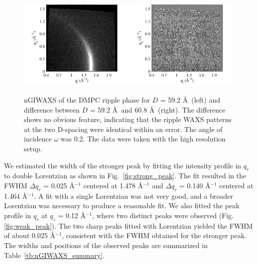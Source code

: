 \begin{figure}[htbp]
  \centering
  \includegraphics[width=0.49\textwidth]{figures/ripple/nGIWAXS/dmpc1_046}
  \includegraphics[width=0.49\textwidth]{figures/ripple/nGIWAXS/046_vs_052}
  \caption{nGIWAXS of the DMPC ripple phase for $D$ = 59.2 \AA\ (left)
  and difference between $D$ = 59.2 \AA\ and 60.8 \AA\ (right). 
  The difference shows no obvious feature, indicating that the ripple WAXS
  patterns at the two D-spacing were identical within an error.
  The angle of incidence $\omega$ was 0.2\textdegree. The data were taken
  with the high resolution setup.}
  \label{fig:nGIWAXS}
\end{figure}

We estimated the width of the stronger peak by fitting 
the intensity profile in $q_r$ to double Lorentzian as shown in 
Fig.~\ref{fig:strong_peak}. The fit resulted in the FWHM $\Delta q_r$
= 0.025 \AA$^{-1}$ centered at 1.478 \AA$^{-1}$ and 
$\Delta q_r$ = 0.140 \AA$^{-1}$ centered at 1.464 \AA$^{-1}$.
A fit with a single Lorentzian was not very good, and 
a broader Lorentzian was necessary to produce a reasonable fit. 
We also fitted the peak profile in $q_r$ at $q_z$ = 0.12 \AA$^{-1}$,
where two distinct peaks were observed (Fig.\ref{fig:weak_peak}).
The two sharp peaks fitted with Lorentzian yielded the FWHM of about 
0.025 \AA$^{-1}$, consistent with the FWHM obtained for the stronger 
peak. The widths and positions of the observed peaks are summarized
in Table~\ref{tb:nGIWAXS_summary}.

